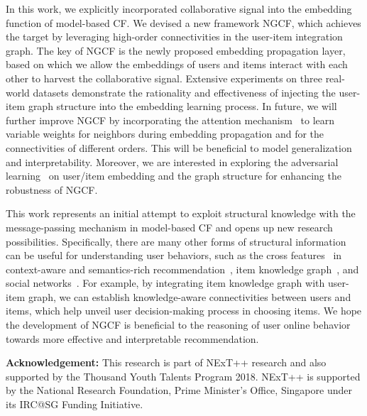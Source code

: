 \documentclass[sigconf]{acmart}
\theoremstyle{definition}
\begin{document}
In this work, we explicitly incorporated collaborative signal into the embedding function of model-based CF.
We devised a new framework NGCF, which achieves the target by leveraging high-order connectivities in the user-item integration graph.
The key of NGCF is the newly proposed embedding propagation layer, based on which we allow the embeddings of users and items interact with each other to harvest the collaborative signal.
Extensive experiments on three real-world datasets demonstrate the rationality and effectiveness of injecting the user-item graph structure into the embedding learning process. In future, we will further improve NGCF by incorporating the attention mechanism~\cite{ACF} to learn variable weights for neighbors during embedding propagation and for the connectivities of different orders. This will be beneficial to model generalization and interpretability. 
Moreover, we are interested in exploring the adversarial learning~\cite{APR} on user/item embedding and the graph structure for enhancing the robustness of NGCF.

This work represents an initial attempt to exploit structural knowledge with the message-passing mechanism in model-based CF and opens up new research possibilities.
Specifically, there are many other forms of structural information can be useful for understanding user behaviors, such as the cross features~\cite{FashionInterpretable} in context-aware and semantics-rich recommendation~\cite{DBLP:conf/mm/LiuWZSXYL17,SongFHYLN18}, item knowledge graph~\cite{KGAT}, and social networks~\cite{ItemSilk}.
For example, by integrating item knowledge graph with user-item graph, we can establish knowledge-aware connectivities between users and items, which help unveil user decision-making process in choosing items.
We hope the development of NGCF is beneficial to the reasoning of user online behavior towards more effective and interpretable recommendation.


\vspace{5px}
\noindent\textbf{Acknowledgement:}
This research is part of NExT++ research and also supported by the Thousand Youth Talents Program 2018.
NExT++ is supported by the National Research Foundation, Prime Minister's Office, Singapore under its IRC@SG Funding Initiative.




%
 


\balance


\balance
\end{document}
